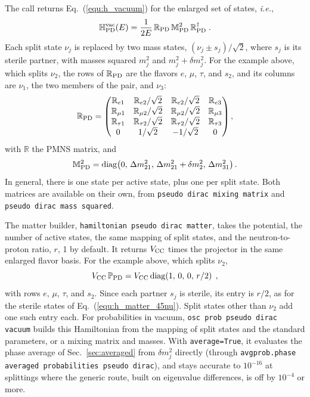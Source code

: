 \documentclass[final,5p,times,twocolumn,sort,compress]{elsarticle}
\makeatletter
\newcommand{\ie}{{\it i.e.}}
\newcommand{\eq}{Eq.}
\DeclareRobustCommand{\_}{%
  \ifmmode\nfss@text{\textunderscore}\else\textunderscore\allowbreak\fi}
\newcommand{\equ}[1]{\eq~(\ref{equ:#1})}
\makeatother
\begin{document}
The call returns \equ{h_vacuum} for the enlarged set of states, \ie,
\begin{equation}
 \label{equ:h_pseudo_dirac}
 \mathbb{H}^{\rm vac}_{\rm PD}(E)
 =
 \frac{1}{2E}\,
 \mathbb{R}_{\rm PD}\,
 \mathbb{M}^2_{\rm PD}\,
 \mathbb{R}_{\rm PD}^\dagger \;.
\end{equation}
Each split state $\nu_j$ is replaced by two mass states, $(\nu_j \pm s_j)/\sqrt{2}$, where $s_j$ is its sterile partner, with masses squared $m_j^2$ and $m_j^2 + \delta m^2_j$. For the example above, which splits $\nu_2$, the rows of $\mathbb{R}_{\rm PD}$ are the flavors $e$, $\mu$, $\tau$, and $s_2$, and its columns are $\nu_1$, the two members of the pair, and $\nu_3$:
\begin{equation}
 \label{equ:mixing_pseudo_dirac}
 \mathbb{R}_{\rm PD}
 =
 \begin{pmatrix}
  \mathbb{R}_{e1} & \mathbb{R}_{e2}/\sqrt{2} & \mathbb{R}_{e2}/\sqrt{2} & \mathbb{R}_{e3} \\
  \mathbb{R}_{\mu 1} & \mathbb{R}_{\mu 2}/\sqrt{2} & \mathbb{R}_{\mu 2}/\sqrt{2} & \mathbb{R}_{\mu 3} \\
  \mathbb{R}_{\tau 1} & \mathbb{R}_{\tau 2}/\sqrt{2} & \mathbb{R}_{\tau 2}/\sqrt{2} & \mathbb{R}_{\tau 3} \\
  0 & 1/\sqrt{2} & -1/\sqrt{2} & 0
 \end{pmatrix} ,
\end{equation}
with $\mathbb{R}$ the PMNS matrix, and
\begin{equation}
 \label{equ:mass_pseudo_dirac}
 \mathbb{M}^2_{\rm PD}
 =
 {\rm diag}\!\left(0,\, \Delta m^2_{21},\, \Delta m^2_{21} + \delta m^2_2,\, \Delta m^2_{31}\right) .
\end{equation}
In general, there is one state per active state, plus one per split state. Both matrices are available on their own, from {\tt pseudo\_dirac\_mixing\_matrix} and {\tt pseudo\_dirac\_mass\_squared}.

The matter builder, {\tt hamiltonian\_pseudo\_dirac\_matter}, takes the potential, the number of active states, the same mapping of split states, and the neutron-to-proton ratio, $r$, 1 by default. It returns $V_{\rm CC}$ times the projector in the same enlarged flavor basis. For the example above, which splits $\nu_2$,
\begin{equation}
 \label{equ:matter_pseudo_dirac}
 V_{\rm CC}\, \mathbb{P}_{\rm PD}
 =
 V_{\rm CC}\,
 {\rm diag}\!\left(1,\, 0,\, 0,\, r/2\right) \;,
\end{equation}
with rows $e$, $\mu$, $\tau$, and $s_2$. Since each partner $s_j$ is sterile, its entry is $r/2$, as for the sterile states of \equ{h_matter_45nu}. Split states other than $\nu_2$ add one such entry each. For probabilities in vacuum, {\tt osc\_prob\_pseudo\_dirac\_vacuum} builds this Hamiltonian from the mapping of split states and the standard parameters, or a mixing matrix and masses. With {\tt average=True}, it evaluates the phase average of Sec.~\ref{sec:averaged} from $\delta m^2_j$ directly (through {\tt avgprob.phase\_averaged\_probabilities\_pseudo\_dirac}), and stays accurate to $10^{-16}$ at splittings where the generic route, built on eigenvalue differences, is off by $10^{-4}$ or more.
\end{document}
